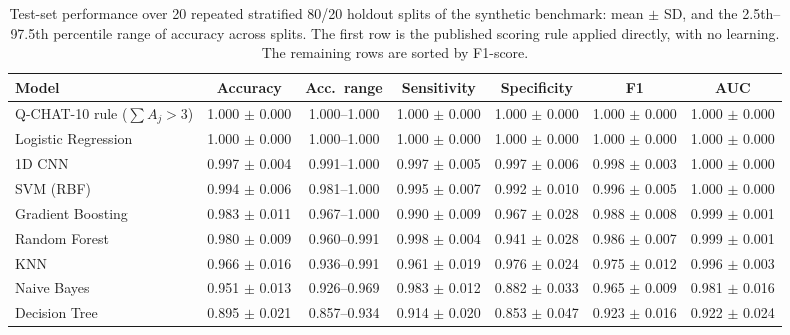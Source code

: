 \begin{table}[t]
\centering
\caption{Test-set performance over 20 repeated stratified 80/20 holdout splits of the synthetic benchmark: mean $\pm$ SD, and the 2.5th--97.5th percentile range of accuracy across splits. The first row is the published scoring rule applied directly, with no learning. The remaining rows are sorted by F1-score.}
\label{tab:main}
\small
\begin{tabular}{lcccccc}
\toprule
Model & Accuracy & Acc.\ range & Sensitivity & Specificity & F1 & AUC \\
\midrule
Q-CHAT-10 rule ($\sum A_j>3$) & 1.000 $\pm$ 0.000 & 1.000--1.000 & 1.000 $\pm$ 0.000 & 1.000 $\pm$ 0.000 & 1.000 $\pm$ 0.000 & 1.000 $\pm$ 0.000 \\
\midrule
Logistic Regression & 1.000 $\pm$ 0.000 & 1.000--1.000 & 1.000 $\pm$ 0.000 & 1.000 $\pm$ 0.000 & 1.000 $\pm$ 0.000 & 1.000 $\pm$ 0.000 \\
1D CNN & 0.997 $\pm$ 0.004 & 0.991--1.000 & 0.997 $\pm$ 0.005 & 0.997 $\pm$ 0.006 & 0.998 $\pm$ 0.003 & 1.000 $\pm$ 0.000 \\
SVM (RBF) & 0.994 $\pm$ 0.006 & 0.981--1.000 & 0.995 $\pm$ 0.007 & 0.992 $\pm$ 0.010 & 0.996 $\pm$ 0.005 & 1.000 $\pm$ 0.000 \\
Gradient Boosting & 0.983 $\pm$ 0.011 & 0.967--1.000 & 0.990 $\pm$ 0.009 & 0.967 $\pm$ 0.028 & 0.988 $\pm$ 0.008 & 0.999 $\pm$ 0.001 \\
Random Forest & 0.980 $\pm$ 0.009 & 0.960--0.991 & 0.998 $\pm$ 0.004 & 0.941 $\pm$ 0.028 & 0.986 $\pm$ 0.007 & 0.999 $\pm$ 0.001 \\
KNN & 0.966 $\pm$ 0.016 & 0.936--0.991 & 0.961 $\pm$ 0.019 & 0.976 $\pm$ 0.024 & 0.975 $\pm$ 0.012 & 0.996 $\pm$ 0.003 \\
Naive Bayes & 0.951 $\pm$ 0.013 & 0.926--0.969 & 0.983 $\pm$ 0.012 & 0.882 $\pm$ 0.033 & 0.965 $\pm$ 0.009 & 0.981 $\pm$ 0.016 \\
Decision Tree & 0.895 $\pm$ 0.021 & 0.857--0.934 & 0.914 $\pm$ 0.020 & 0.853 $\pm$ 0.047 & 0.923 $\pm$ 0.016 & 0.922 $\pm$ 0.024 \\
\bottomrule
\end{tabular}
\end{table}
